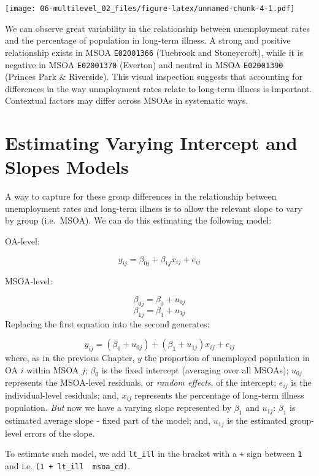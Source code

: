 \documentclass[]{book}
\begin{document}
\texttt{[image: 06-multilevel\_02\_files/figure-latex/unnamed-chunk-4-1.pdf]}

We can observe great variability in the relationship between
unemployment rates and the percentage of population in long-term
illness. A strong and positive relationship exists in MSOA
\texttt{E02001366} (Tuebrook and Stoneycroft), while it is negative in
MSOA \texttt{E02001370} (Everton) and neutral in MSOA \texttt{E02001390}
(Princes Park \& Riverside). This visual inspection suggests that
accounting for differences in the way unmployment rates relate to
long-term illness is important. Contextual factors may differ across
MSOAs in systematic ways.

\section{Estimating Varying Intercept and Slopes
Models}\label{estimating-varying-intercept-and-slopes-models}

A way to capture for these group differences in the relationship between
unemployment rates and long-term illness is to allow the relevant slope
to vary by group (i.e.~MSOA). We can do this estimating the following
model:

OA-level:

\[y_{ij} = \beta_{0j} + \beta_{1j}x_{ij} + e_{ij}\]

MSOA-level:

\[\beta_{0j} = \beta_{0} + u_{0j}\] \[\beta_{1j} = \beta_{1} + u_{1j} \]
Replacing the first equation into the second generates:

\[y_{ij} = (\beta_{0} + u_{0j}) + (\beta_{1} + u_{1j})x_{ij} + e_{ij}\]
where, as in the previous Chapter, \(y\) the proportion of unemployed
population in OA \(i\) within MSOA \(j\); \(\beta_{0}\) is the fixed
intercept (averaging over all MSOAs); \(u_{0j}\) represents the
MSOA-level residuals, or \emph{random effects}, of the intercept;
\(e_{ij}\) is the individual-level residuals; and, \(x_{ij}\) represents
the percentage of long-term illness population. \emph{But} now we have a
varying slope represented by \(\beta_{1}\) and \(u_{1j}\): \(\beta_{1}\)
is estimated average slope - fixed part of the model; and, \(u_{1j}\) is
the estimated group-level errors of the slope.

To estimate such model, we add \texttt{lt\_ill} in the bracket with a
\texttt{+} sign between \texttt{1} and \texttt{\textbar{}} i.e.
\texttt{(1\ +\ lt\_ill\ \textbar{}\ msoa\_cd)}.
\end{document}
